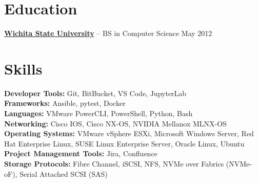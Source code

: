 \documentclass[11pt]{article}       %
\begin{document}
\vspace{-18.5pt}

\section*{Education}
\textbf{\href{https://www.wichita.edu}{Wichita State University}} -- BS in Computer Science \hfill May 2012




\section*{Skills}
\textbf{Developer Tools:} Git, BitBucket, VS Code, JupyterLab \\
\textbf{Frameworks:} Ansible, pytest, Docker \\
\textbf{Languages:} VMware PowerCLI, PowerShell, Python, Bash \\
\textbf{Networking:} Cisco IOS, Cisco NX-OS, NVIDIA Mellanox MLNX-OS \\
\textbf{Operating Systems:} VMware vSphere ESXi, Microsoft Windows Server, Red Hat Enterprise Linux, SUSE Linux Enterprise Server, Oracle Linux, Ubuntu \\
\textbf{Project Management Tools:} Jira, Confluence \\
\textbf{Storage Protocols:} Fibre Channel, iSCSI, NFS, NVMe over Fabrics (NVMe-oF), Serial Attached SCSI (SAS)

\vspace{-6.5pt}
\end{document}
